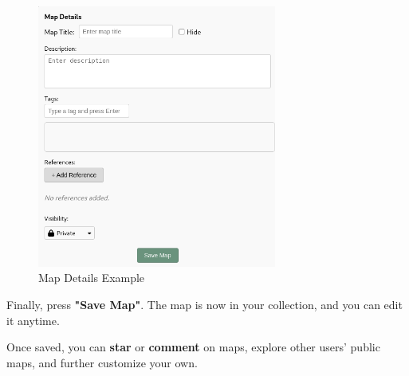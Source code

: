 \documentclass{article}
\begin{document}
\begin{figure}[h!]
  \centering
  \includegraphics[width=0.7\textwidth]{map_details.png}
  \caption{Map Details Example}
\end{figure}

Finally, press \textbf{"Save Map"}. The map is now in your collection, and you can 
edit it anytime.

Once saved, you can \textbf{star} or \textbf{comment} on maps, explore other 
users’ public maps, and further customize your own.
\end{document}
